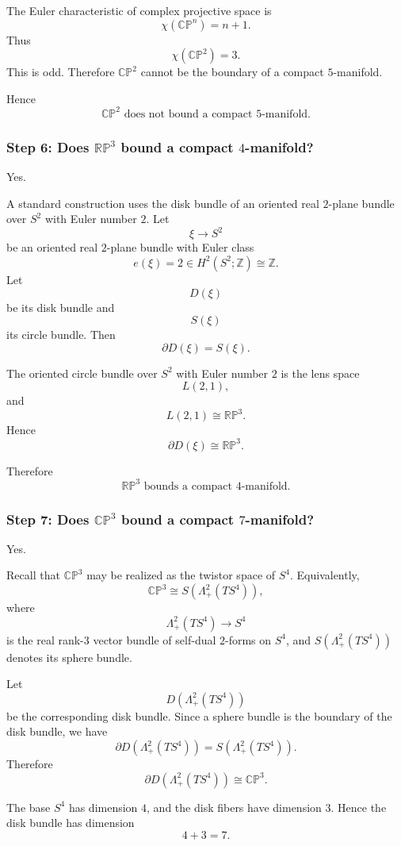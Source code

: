 \documentclass[12pt,a4paper]{article}
\theoremstyle{notespace}
\begin{document}
The Euler characteristic of complex projective space is
\[
\chi(\mathbb{CP}^n)=n+1.
\]
Thus
\[
\chi(\mathbb{CP}^2)=3.
\]
This is odd. Therefore \(\mathbb{CP}^2\) cannot be the boundary of a compact
\(5\)-manifold.

Hence
\[
\boxed{
	\mathbb{CP}^2
	\text{ does not bound a compact }5\text{-manifold.}
}
\]

\subsubsection*{Step 6: Does \(\mathbb{RP}^3\) bound a compact \(4\)-manifold?}

Yes.

A standard construction uses the disk bundle of an oriented real \(2\)-plane
bundle over \(S^2\) with Euler number \(2\). Let
\[
\xi\to S^2
\]
be an oriented real \(2\)-plane bundle with Euler class
\[
e(\xi)=2\in H^2(S^2;\mathbb Z)\cong \mathbb Z.
\]
Let
\[
D(\xi)
\]
be its disk bundle and
\[
S(\xi)
\]
its circle bundle. Then
\[
\partial D(\xi)=S(\xi).
\]

The oriented circle bundle over \(S^2\) with Euler number \(2\) is the lens space
\[
L(2,1),
\]
and
\[
L(2,1)\cong \mathbb{RP}^3.
\]
Hence
\[
\partial D(\xi)\cong \mathbb{RP}^3.
\]

Therefore
\[
\boxed{
	\mathbb{RP}^3
	\text{ bounds a compact }4\text{-manifold.}
}
\]

\subsubsection*{Step 7: Does \(\mathbb{CP}^3\) bound a compact \(7\)-manifold?}

Yes.

Recall that \(\mathbb{CP}^3\) may be realized as the twistor space of \(S^4\).
Equivalently,
\[
\mathbb{CP}^3
\cong
S(\Lambda^2_+(TS^4)),
\]
where
\[
\Lambda^2_+(TS^4)\to S^4
\]
is the real rank-\(3\) vector bundle of self-dual \(2\)-forms on \(S^4\), and
\(S(\Lambda^2_+(TS^4))\) denotes its sphere bundle.

Let
\[
D(\Lambda^2_+(TS^4))
\]
be the corresponding disk bundle. Since a sphere bundle is the boundary of the
disk bundle, we have
\[
\partial D(\Lambda^2_+(TS^4))
=
S(\Lambda^2_+(TS^4)).
\]
Therefore
\[
\partial D(\Lambda^2_+(TS^4))
\cong
\mathbb{CP}^3.
\]

The base \(S^4\) has dimension \(4\), and the disk fibers have dimension \(3\).
Hence the disk bundle has dimension
\[
4+3=7.
\]
\end{document}
